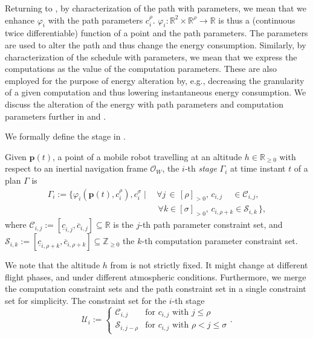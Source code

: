 Returning to , by characterization of the path with parameters, we mean that we enhance $\varphi_i$ with the path parameters $c_i^\rho$. $\varphi_i:\mathbb{R}^2\times\mathbb{R}^\rho\rightarrow\mathbb{R}$ is thus a (continuous twice differentiable) function of a point and the path parameters. The parameters are used to alter the path and thus change the energy consumption.
Similarly, by characterization of the schedule with parameters, we mean that we express the computations as the value of the computation parameters. These are also employed for the purpose of energy alteration by, e.g., decreasing the granularity of a given computation and thus lowering instantaneous energy consumption. We discuss the alteration of the energy with path parameters and computation parameters further in  and .

We formally define the stage in .

\begin{highlight}  
  \begin{defn}[Stage]\label{def:stage}
    Given $\mathbf{p}(t)$, a point of a mobile robot travelling at an altitude $h\in\mathbb{R}_{\geq 0}$ with respect to an inertial navigation frame $\mathcal{O}_W$, the $i$-th \emph{stage} $\Gamma_i$ at time instant $t$ of a plan $\Gamma$ is
    \begin{equation*}\begin{split}
      \Gamma_i:=\{\varphi_i(\mathbf{p}(t),c_i^\rho),c_i^\sigma\mid
      \,&\forall j\,\in\,[\rho]_{>0},\,c_{i,j}\,\,\,\,\,\,\,\in\mathcal{C}_{i,j},\,\\
        &\,\forall k\in[\sigma]_{>0},\,c_{i,\rho+k}\in\mathcal{S}_{i,k}\,\},
    \end{split}\end{equation*}
    where $\mathcal{C}_{i,j}:=[\underline{c}_{i,j},\overline{c}_{i,j}]\subseteq\mathbb{R}$ is the $j$-th path parameter constraint set, and $\mathcal{S}_{i,k}:=[\underline{c}_{i,\rho+k},\overline{c}_{i,\rho+k}]\subseteq\mathbb{Z}_{\geq 0}$ the $k$-th computation parameter constraint set.
  \end{defn}
\end{highlight}

We note that the altitude $h$ from  is not strictly fixed. It might change at different flight phases, and under different atmospheric conditions. Furthermore, we merge the computation constraint sets and the path constraint set in a single constraint set for simplicity. The constraint set for the $i$-th stage
\begin{equation}\label{eq:constraint-set}
  \mathcal{U}_i:=\begin{cases}
  \mathcal{C}_{i,j} & \text{for } c_{i,j} \text{ with } j\leq\rho\\
  \mathcal{S}_{i,j-\rho} & \text{for } c_{i,j} \text{ with } \rho<j\leq\sigma
\end{cases}.\end{equation}

